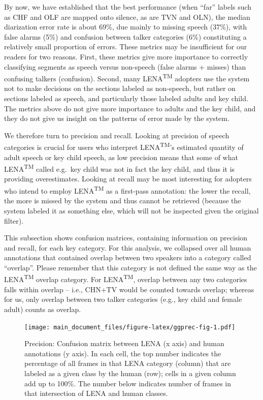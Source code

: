 \documentclass[english,floatsintext,man]{apa6}
\begin{document}
By now, we have established that the best performance (when
\enquote{far} labels such as CHF and OLF are mapped onto silence, as are
TVN and OLN), the median diarization error rate is about 69\%, due
mainly to missing speech (37\%), with false alarms (5\%) and confusion
between talker categories (6\%) constituting a relatively small
proportion of errors. These metrics may be insufficient for our readers
for two reasons. First, these metrics give more importance to correctly
classifying segments as speech versus non-speech (false alarms + misses)
than confusing talkers (confusion). Second, many
LENA\textsuperscript{TM} adopters use the system not to make decisions
on the sections labeled as non-speech, but rather on sections labeled as
speech, and particularly those labeled adults and key child. The metrics
above do not give more importance to adults and the key child, and they
do not give us insight on the patterns of error made by the system.

We therefore turn to precision and recall. Looking at precision of
speech categories is crucial for users who interpret
LENA\textsuperscript{TM}'s estimated quantity of adult speech or key
child speech, as low precision means that some of what
LENA\textsuperscript{TM} called e.g.~key child was not in fact the key
child, and thus it is providing overestimates. Looking at recall may be
most interesting for adopters who intend to employ
LENA\textsuperscript{TM} as a first-pass annotation: the lower the
recall, the more is missed by the system and thus cannot be retrieved
(because the system labeled it as something else, which will not be
inspected given the original filter).

This subsection shows confusion matrices, containing information on
precision and recall, for each key category. For this analysis, we
collapsed over all human annotations that contained overlap between two
speakers into a category called \enquote{overlap}. Please remember that
this category is not defined the same way as the
LENA\textsuperscript{TM} overlap category. For LENA\textsuperscript{TM},
overlap between any two categories falls within overlap -- i.e., CHN+TV
would be counted towards overlap; whereas for us, only overlap between
two talker categories (e.g., key child and female adult) counts as
overlap.

\begin{figure}
\centering
\texttt{[image: main\_document\_files/figure-latex/ggprec-fig-1.pdf]}
\caption{\label{fig:ggprec-fig}Precision: Confusion matrix between LENA (x
axis) and human annotations (y axis). In each cell, the top number
indicates the percentage of all frames in that LENA category (column)
that are labeled as a given class by the human (row); cells in a given
column add up to 100\%. The number below indicates number of frames in
that intersection of LENA and human classes.}
\end{figure}
\end{document}
